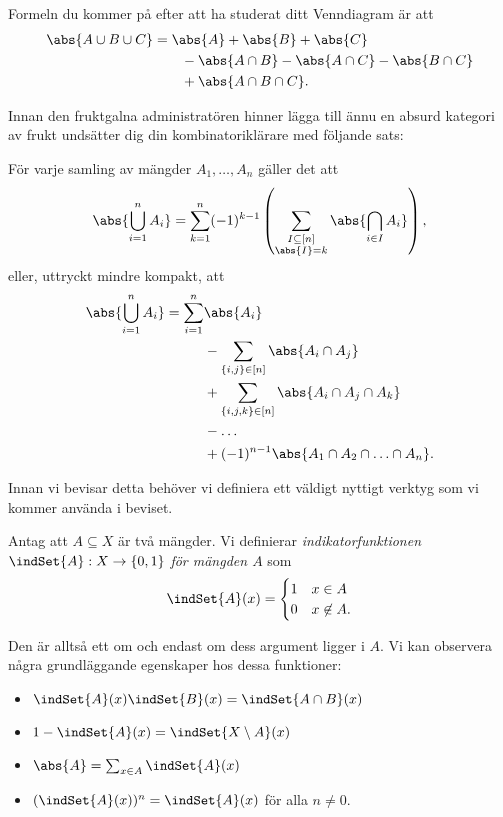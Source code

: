 \documentclass[nobib]{tufte-handout}
\begin{document}
Formeln du kommer på efter att ha studerat ditt Venndiagram är att
\begin{align*}
  \abs{A \cup B \cup C} &= \abs{A} + \abs{B} + \abs{C}\\
  &\qquad - \abs{A \cap B} - \abs{A \cap C} - \abs{B \cap C}\\
  &\qquad + \abs{A \cap B \cap C}.
\end{align*}

Innan den fruktgalna administratören hinner lägga till ännu en absurd kategori av frukt undsätter dig din kombinatoriklärare med följande sats:
\begin{theorem}\label{theorem_inclusion_exclusion}
  För varje samling av mängder $A_1, \ldots, A_n$ gäller det att
  $$\abs{\bigcup_{i=1}^n A_i} = \sum_{k=1}^{n} (-1)^{k-1}\left(\sum_{\substack{I \subseteq [n]\\\abs{I} = k}} \abs{\bigcap_{i \in I} A_i}\right),$$
  eller, uttryckt mindre kompakt, att
  \begin{align*}
    \abs{\bigcup_{i=1}^n A_i} = \sum_{i=1}^n &\abs{A_i}\\
    & - \sum_{\{i,j\} \in [n]} \abs{A_i \cap A_j}\\
    & + \sum_{ \{i, j, k\} \in [n] } \abs{A_i \cap A_j \cap A_k}\\
    & - \ldots\\
    & + (-1)^{n-1}\abs{A_1\cap A_2\cap\ldots\cap A_n}.
  \end{align*}
\end{theorem}

Innan vi bevisar detta behöver vi definiera ett väldigt nyttigt verktyg som vi kommer använda i beviset.

\begin{definition}
  Antag att $A \subseteq X$ är två mängder. Vi definierar \emph{indikatorfunktionen} $\indSet{A}: X \to \{0,1\}$ \emph{för mängden $A$} som
  $$\indSet{A}(x) = \begin{cases}
    1  & x \in A \\
    0 & x \not\in A.
  \end{cases}$$

  Den är alltså ett om och endast om dess argument ligger i $A$. Vi kan observera några grundläggande egenskaper hos dessa funktioner:
  \begin{itemize}
    \item $\indSet{A}(x)\indSet{B}(x) = \indSet{A\cap B}(x)$
    \item $1 - \indSet{A}(x) = \indSet{X \setminus A}(x)$
    \item $\abs{A} = \sum_{x \in A} \indSet{A}(x)$
    \item $(\indSet{A}(x))^n = \indSet{A}(x)$ för alla $n \neq 0$.
  \end{itemize}
\end{definition}
\end{document}

